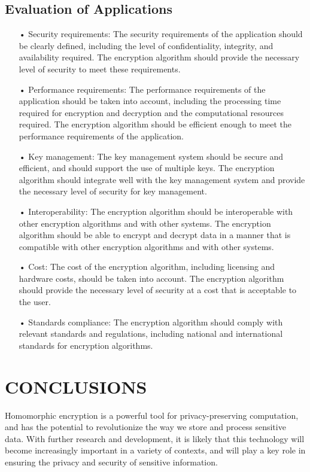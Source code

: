 \documentclass[a4paper,11pt]{report}
\begin{document}
\section{Evaluation of Applications}
\begin{itemize}
\item[•] Security requirements: The security requirements of the application should be clearly defined, including the level of confidentiality, integrity, and availability required. The encryption algorithm should provide the necessary level of security to meet these requirements.

\item[•] Performance requirements: The performance requirements of the application should be taken into account, including the processing time required for encryption and decryption and the computational resources required. The encryption algorithm should be efficient enough to meet the performance requirements of the application.

\item[•] Key management: The key management system should be secure and efficient, and should support the use of multiple keys. The encryption algorithm should integrate well with the key management system and provide the necessary level of security for key management.

\item[•] Interoperability: The encryption algorithm should be interoperable with other encryption algorithms and with other systems. The encryption algorithm should be able to encrypt and decrypt data in a manner that is compatible with other encryption algorithms and with other systems.

\item[•] Cost: The cost of the encryption algorithm, including licensing and hardware costs, should be taken into account. The encryption algorithm should provide the necessary level of security at a cost that is acceptable to the user.

\item[•] Standards compliance: The encryption algorithm should comply with relevant standards and regulations, including national and international standards for encryption algorithms.
\end{itemize}

\chapter{CONCLUSIONS}
Homomorphic encryption is a powerful tool for privacy-preserving computation, and has the potential to revolutionize the way we store and process sensitive data. With further research and development, it is likely that this technology will become increasingly important in a variety of contexts, and will play a key role in ensuring the privacy and security of sensitive information.
\end{document}
